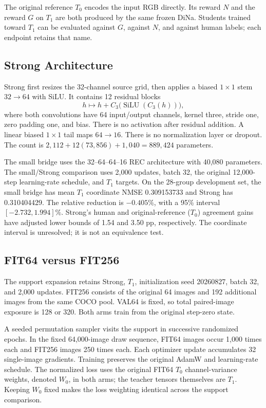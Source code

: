 \documentclass[10pt,twocolumn,letterpaper]{article}
\begin{document}
The original reference $T_0$ encodes the input RGB directly. Its reward $N$ and the reward $G$ on $T_1$ are both produced by the same frozen DiNa. Students trained toward $T_1$ can be evaluated against $G$, against $N$, and against human labels; each endpoint retains that name.

\subsection{Strong Architecture}
Strong first resizes the 32-channel source grid, then applies a biased $1\times1$ stem $32\to64$ with SiLU. It contains 12 residual blocks
\begin{equation}
 h\longmapsto h+C_3\big(\operatorname{SiLU}(C_3(h))\big),
\end{equation}
where both convolutions have 64 input/output channels, kernel three, stride one, zero padding one, and bias. There is no activation after residual addition. A linear biased $1\times1$ tail maps $64\to16$. There is no normalization layer or dropout. The count is $2,112+12(73,856)+1,040=889,424$ parameters.

The small bridge uses the 32--64--64--16 REC architecture with 40,080 parameters. The small/Strong comparison uses 2,000 updates, batch 32, the original 12,000-step learning-rate schedule, and $T_1$ targets. On the 28-group development set, the small bridge has mean $T_1$ coordinate NMSE 0.309153733 and Strong has 0.310404429. The relative reduction is $-0.405\%$, with a 95\% interval $[-2.732,1.994]\%$. Strong's human and original-reference ($T_0$) agreement gains have adjusted lower bounds of 1.54 and 3.50 pp, respectively. The coordinate interval is unresolved; it is not an equivalence test.

\subsection{FIT64 versus FIT256}
The support expansion retains Strong, $T_1$, initialization seed 20260827, batch 32, and 2,000 updates. FIT256 consists of the original 64 images and 192 additional images from the same COCO pool. VAL64 is fixed, so total paired-image exposure is 128 or 320. Both arms train from the original step-zero state.

A seeded permutation sampler visits the support in successive randomized epochs. In the fixed 64,000-image draw sequence, FIT64 images occur 1,000 times each and FIT256 images 250 times each. Each optimizer update accumulates 32 single-image gradients. Training preserves the original AdamW and learning-rate schedule. The normalized loss uses the original FIT64 $T_0$ channel-variance weights, denoted $W_0$, in both arms; the teacher tensors themselves are $T_1$. Keeping $W_0$ fixed makes the loss weighting identical across the support comparison.
\end{document}

